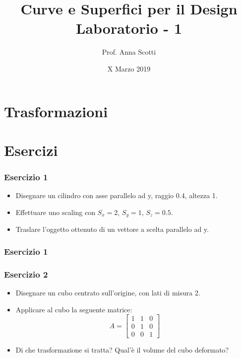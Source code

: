 \documentclass{beamer}
\title[Curve e Sup. - Lab 1]{Curve e Superfici per il Design \\ Laboratorio - 1}
\author[Prof. Scotti]{Prof. Anna Scotti}
\date{X Marzo 2019}
\newcommand{\fig}{figures}
\begin{document}
\begin{frame}
\maketitle
\end{frame}
\section{Trasformazioni}


\section{Esercizi}
\begin{frame}
\frametitle{Esercizio 1}
\begin{itemize}
\item Disegnare un cilindro con asse parallelo ad y, raggio 0.4, altezza 1.
\item Effettuare uno scaling con $S_x =2$, $S_y=1$, $S_z=0.5$.
\item Traslare l'oggetto ottenuto di un vettore a scelta parallelo ad y.
\end{itemize}
\end{frame}
\begin{frame}
\frametitle{Esercizio 1}
\begin{center}
\end{center}
\end{frame}
\begin{frame}
\frametitle{Esercizio 2}
\begin{itemize}
\item Disegnare un  cubo centrato sull'origine, con lati di misura 2.
\item Applicare al cubo la seguente matrice: 
\begin{displaymath}
A = \begin{bmatrix}
    1 & 1 & 0\\
    0 & 1 & 0\\
    0 & 0 & 1
    \end{bmatrix}
\end{displaymath}
\item Di che trasformazione si tratta? Qual'\`e il volume del cubo deformato?
\end{itemize}
\end{frame}
\end{document}
